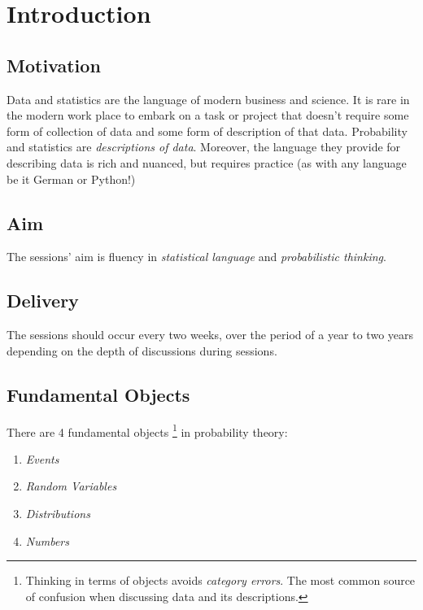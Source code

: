 


\maketitle
\clearpage

\section{Introduction}

\subsection{Motivation}

Data and statistics are the language of modern business and science. 
It is rare in the modern work place to embark on a task or project that doesn't require 
some form of collection of data and some form of description of that data. 
Probability and statistics are \emph{descriptions of data}. 
Moreover, 
the language they provide for describing data is rich and nuanced, 
but requires practice (as with any language be it German or Python!)

\subsection{Aim}

The sessions' aim is fluency in \emph{statistical language} and \emph{probabilistic thinking}.

\subsection{Delivery}

The sessions should occur every two weeks,
over the period of a year to two years depending on the depth of discussions during sessions.

\subsection{Fundamental Objects}

There are 4 fundamental objects%
\footnote{Thinking in terms of objects avoids \emph{category errors}.
The most common source of confusion when discussing 
data and its descriptions.
}
in probability theory:

\begin{enumerate}
\def\labelenumi{\arabic{enumi}.}
\item \emph{Events}
\item \emph{Random Variables}
\item \emph{Distributions}
\item \emph{Numbers}
\end{enumerate}

